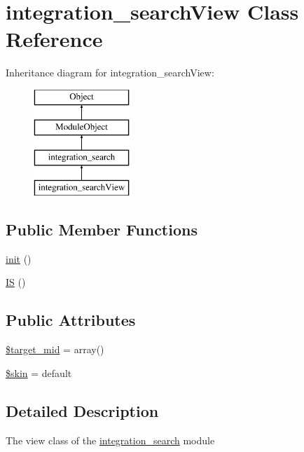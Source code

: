 \hypertarget{classintegration__searchView}{}\section{integration\+\_\+search\+View Class Reference}
\label{classintegration__searchView}
Inheritance diagram for integration\+\_\+search\+View\+:\begin{figure}[H]
\begin{center}
\leavevmode
\includegraphics[height=4.000000cm]{classintegration__searchView}
\end{center}
\end{figure}
\subsection*{Public Member Functions}
\begin{DoxyCompactItemize}
\item 
\hyperlink{classintegration__searchView_aeed621ea43574fc7b4c5d650d1d698b6}{init} ()
\item 
\hyperlink{classintegration__searchView_a271296176ae955cb88c55c5eac511a23}{I\+S} ()
\end{DoxyCompactItemize}
\subsection*{Public Attributes}
\begin{DoxyCompactItemize}
\item 
\hyperlink{classintegration__searchView_a17efafd7259acddb90e2c181bcfeaa38}{\$target\+\_\+mid} = array()
\item 
\hyperlink{classintegration__searchView_a4281fc0752039ec4025ddaca5771f074}{\$skin} = \textquotesingle{}default\textquotesingle{}
\end{DoxyCompactItemize}


\subsection{Detailed Description}
The view class of the \hyperlink{classintegration__search}{integration\+\_\+search} module

